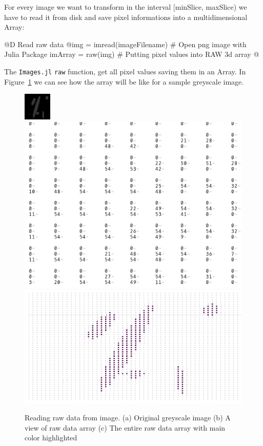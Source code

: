 \documentclass[11pt,oneside]{article}	%
\begin{document}
For every image we want to transform in the interval [minSlice, maxSlice) we have to read it from disk and save pixel informations into a multidimensional Array:

@D Read raw data
@{img = imread(imageFilename) # Open png image with Julia Package
imArray = raw(img) # Putting pixel values into RAW 3d array @}

The \texttt{Images.jl} \texttt{raw} function, get all pixel values saving them in an Array. In Figure~\ref{fig:rawImage} we can see how the array will be like for a sample greyscale image.

\begin{figure}[htb] %
   \centering
   \includegraphics[width=0.27\linewidth]{images/grayscalesample.png}
   \includegraphics[width=0.47\linewidth]{images/imArraypart.png} \\
   
   \includegraphics[width=0.67\linewidth]{images/imArrayfull.png} \hfill
   \caption{Reading raw data from image. (a) Original greyscale image (b) A view of raw data array (c) The entire raw data array with main color highlighted}
   \label{fig:rawImage}
\end{figure}
\end{document}
